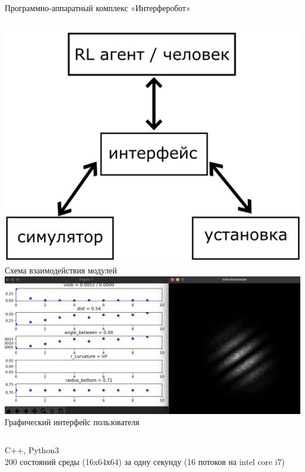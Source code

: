 \begin{frame}{Программно-аппаратный комплекс «Интерферобот»}
\begin{columns}
\centering
\includegraphics[width=1\linewidth]{images/interferobot_complex.png}
Схема взаимодействия модулей
\centering
\includegraphics[width=1\linewidth]{images/gui.png}
Графический интерфейс пользователя
\end{columns}
\vspace{15pt}
C++, Python3\\
200 состояний среды (16x64х64) за одну секунду (16 потоков на intel core i7)
\end{frame}

